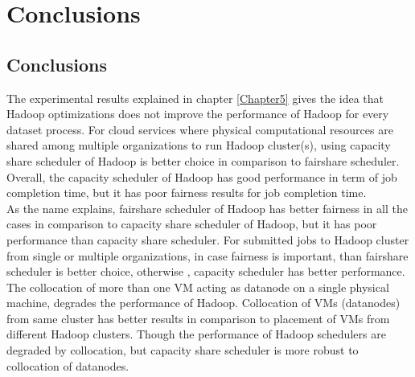 
\chapter{Conclusions} %

\label{Chapter7} %



\section{Conclusions}
 
 
 The experimental results explained in chapter \ref{Chapter5} gives the idea that Hadoop optimizations does not improve the performance of Hadoop for every dataset process. For cloud services where physical computational resources are shared among multiple organizations to run Hadoop cluster(s), using capacity share scheduler of Hadoop is better choice in comparison to fairshare scheduler. Overall, the capacity scheduler of Hadoop has good performance in term of job completion time, but it has poor fairness results for job completion time. \\
 
 As the name explains, fairshare scheduler of Hadoop has better fairness in all the cases in comparison to capacity share scheduler of Hadoop, but it has poor performance than capacity share scheduler. For submitted jobs to Hadoop cluster from single or multiple organizations, in case fairness is important, than fairshare scheduler is better choice, otherwise , capacity scheduler has better performance. \\
 
 The collocation of more than one VM acting as datanode on a single physical machine, degrades the performance  of Hadoop. Collocation of VMs (datanodes)‌ from same cluster has better results in comparison to placement of VMs from different Hadoop clusters. Though the performance of Hadoop schedulers are degraded by collocation, but capacity share scheduler is more robust to collocation of datanodes.\\
 
